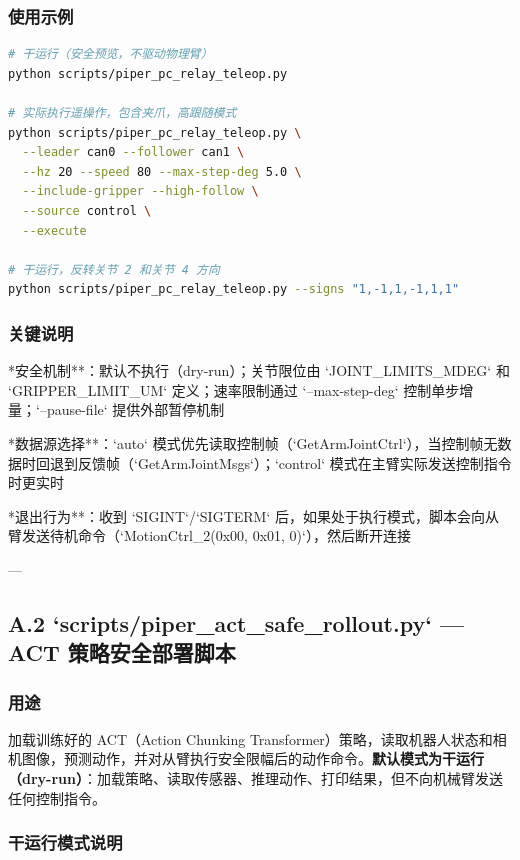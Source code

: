 \documentclass[UTF8,a4paper,11pt]{ctexart}
\begin{document}
{\subsubsection{使用示例}

\begin{lstlisting}[language=bash]
# 干运行（安全预览，不驱动物理臂）
python scripts/piper_pc_relay_teleop.py

# 实际执行遥操作，包含夹爪，高跟随模式
python scripts/piper_pc_relay_teleop.py \
  --leader can0 --follower can1 \
  --hz 20 --speed 80 --max-step-deg 5.0 \
  --include-gripper --high-follow \
  --source control \
  --execute

# 干运行，反转关节 2 和关节 4 方向
python scripts/piper_pc_relay_teleop.py --signs "1,-1,1,-1,1,1"
\end{lstlisting}

\subsubsection{关键说明}

\item **安全机制**：默认不执行（dry-run）；关节限位由 `JOINT_LIMITS_MDEG` 和 `GRIPPER_LIMIT_UM` 定义；速率限制通过 `--max-step-deg` 控制单步增量；`--pause-file` 提供外部暂停机制
\item **数据源选择**：`auto` 模式优先读取控制帧（`GetArmJointCtrl`），当控制帧无数据时回退到反馈帧（`GetArmJointMsgs`）；`control` 模式在主臂实际发送控制指令时更实时
\item **退出行为**：收到 `SIGINT`/`SIGTERM` 后，如果处于执行模式，脚本会向从臂发送待机命令（`MotionCtrl_2(0x00, 0x01, 0)`），然后断开连接

---

\subsection{A.2 `scripts/piper_act_safe_rollout.py` — ACT 策略安全部署脚本}

\subsubsection{用途}

加载训练好的 ACT（Action Chunking Transformer）策略，读取机器人状态和相机图像，预测动作，并对从臂执行安全限幅后的动作命令。\textbf{默认模式为干运行（dry-run）}：加载策略、读取传感器、推理动作、打印结果，但不向机械臂发送任何控制指令。

\subsubsection{干运行模式说明}

}
\end{document}
